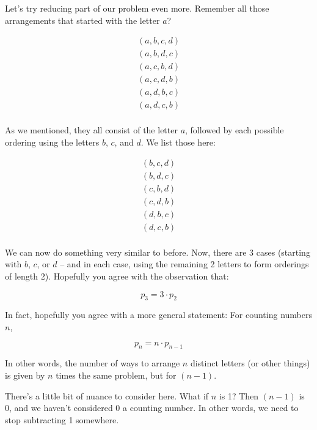 Let's try reducing part of our problem even more. Remember all those arrangements that started with the letter $a$?

\begin{gather*}
(a, b, c, d) \\
(a, b, d, c) \\
(a, c, b, d) \\
(a, c, d, b) \\
(a, d, b, c) \\
(a, d, c, b) \\
\end{gather*}

As we mentioned, they all consist of the letter $a$, followed by each possible ordering using the letters $b$, $c$, and $d$. We list those here:

\begin{gather*}
(b, c, d) \\
(b, d, c) \\
(c, b, d) \\
(c, d, b) \\
(d, b, c) \\
(d, c, b) \\
\end{gather*}

We can now do something very similar to before. Now, there are 3 cases (starting with $b$, $c$, or $d$ -- and in each case, using the remaining 2 letters to form orderings of length 2). Hopefully you agree with the observation that:

\begin{equation*}
p_3 = 3 \cdot p_2
\end{equation*}


In fact, hopefully you agree with a more general statement: For counting numbers $n$,

\begin{equation}
p_n = n \cdot p_{n-1}
\end{equation}

In other words, the number of ways to arrange $n$ distinct letters (or other things) is given by $n$ times the same problem, but for $(n-1)$. 


There's a little bit of nuance to consider here. What if $n$ is 1? Then $(n-1)$ is 0, and we haven't considered 0 a counting number. In other words, we need to stop subtracting 1 somewhere.

